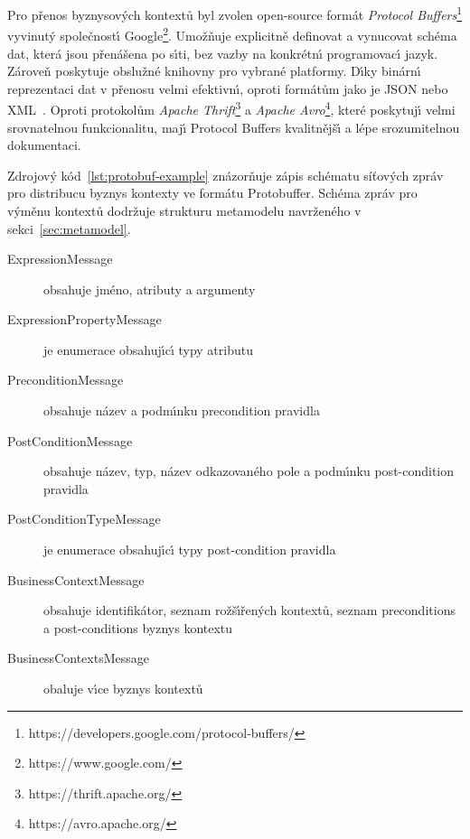 Pro přenos byznysov\'ych kontextů byl zvolen open-source formát
\textit{Protocol Buffers}\footnote{https://developers.google.com/protocol-buffers/}\cite{varda2008protocol}
vyvinut\'y společnost\'{\i} Google\footnote{https://www.google.com/}.
Umožňuje explicitně definovat a vynucovat schéma dat,
která jsou přenášena po s\'{\i}ti, bez vazby na konkrétn\'{\i} programovac\'{\i}
jazyk. Zároveň poskytuje obslužné knihovny pro vybrané platformy.
D\'{\i}ky binárn\'{\i} reprezentaci dat v přenosu velmi efektivn\'{\i},
oproti formátům jako je \gls{JSON} nebo \gls{XML}~\cite{maeda2012performance}.
Oproti protokolům \textit{Apache Thrift}\footnote{https://thrift.apache.org/}
a \textit{Apache Avro}\footnote{https://avro.apache.org/}, které poskytuj\'{\i}
velmi srovnatelnou funkcionalitu, maj\'{\i} Protocol Buffers
kvalitnějš\'{\i} a lépe srozumitelnou dokumentaci.



Zdrojov\'y kód~\ref{lst:protobuf-example} znázorňuje zápis schématu
síťových zpráv pro distribucu byznys kontexty ve formátu Protobuffer.
Schéma zpráv pro v\'yměnu kontextů dodržuje strukturu metamodelu navrženého
v sekci~\ref{sec:metamodel}.

\begin{description}
    \item [ExpressionMessage] obsahuje jméno, atributy a argumenty 
    \item [ExpressionPropertyMessage] je enumerace obsahuj\'{\i}c\'{\i} typy atributu 
    \item [PreconditionMessage] obsahuje název a podm\'{\i}nku precondition pravidla
    \item [PostConditionMessage] obsahuje název, typ, název odkazovaného pole a podm\'{\i}nku post-condition pravidla
    \item [PostConditionTypeMessage] je enumerace obsahuj\'{\i}c\'{\i} typy post-condition pravidla
    \item [BusinessContextMessage] obsahuje identifikátor, seznam rožš\'{\i}řen\'ych kontextů, seznam preconditions a post-conditions byznys kontextu
    \item [BusinessContextsMessage] obaluje v\'{\i}ce byznys kontextů
\end{description}

